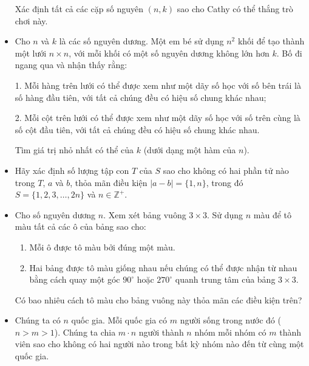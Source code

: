 \documentclass[11pt]{scrartcl}
\begin{document}
\begin{itemize}[label=, leftmargin=0em, itemsep=0.5em]
\begin{btvn}
        Xác định tất cả các cặp số nguyên \( (n,k) \) sao cho Cathy có thể thắng trò chơi này.

    \end{btvn}
    \item \begin{btvn}
        Cho \( n \) và \( k \) là các số nguyên dương. Một em bé sử dụng \( n^2 \) khối để tạo thành một lưới \( n \times n \), với mỗi khối có một số nguyên dương không lớn hơn \( k \). Bố đi ngang qua và nhận thấy rằng:

        1. Mỗi hàng trên lưới có thể được xem như một dãy số học với số bên trái là số hàng đầu tiên, với tất cả chúng đều có hiệu số chung khác nhau;
        
        2. Mỗi cột trên lưới có thể được xem như một dãy số học với số trên cùng là số cột đầu tiên, với tất cả chúng đều có hiệu số chung khác nhau.

        Tìm giá trị nhỏ nhất có thể của \( k \) (dưới dạng một hàm của \( n \)).

    \end{btvn}
    \item \begin{btvn}
        Hãy xác định số lượng tập con $T$ của $S$ sao cho không có hai phần tử nào trong $T$, $a$ và $b$, thỏa mãn điều kiện $|a-b|=\{1,n\}$, trong đó $S =\{1,2,3, \ldots, 2n\}$ và $n \in \mathbb{Z}^+$.
    \end{btvn}

    \item \begin{btvn}
        Cho số nguyên dương $n$. Xem xét bảng vuông $3 \times 3$. Sử dụng $n$ màu để tô màu tất cả các ô của bảng sao cho:
        \begin{enumerate}
            \item Mỗi ô được tô màu bởi đúng một màu.
            \item Hai bảng được tô màu giống nhau nếu chúng có thể được nhận từ nhau bằng cách quay một góc $90^\circ$ hoặc $270^\circ$ quanh trung tâm của bảng $3 \times 3$.
        \end{enumerate}
    Có bao nhiêu cách tô màu cho bảng vuông này thỏa mãn các điều kiện trên?
    \end{btvn}

    \item \begin{btvn}
        Chúng ta có $n$ quốc gia. Mỗi quốc gia có $m$ người sống trong nước đó ($n>m>1$). Chúng ta chia $m \cdot n$ người thành $n$ nhóm mỗi nhóm có $m$ thành viên sao cho không có hai người nào trong bất kỳ nhóm nào đến từ cùng một quốc gia.



\end{btvn}
\end{itemize}
\end{document}
